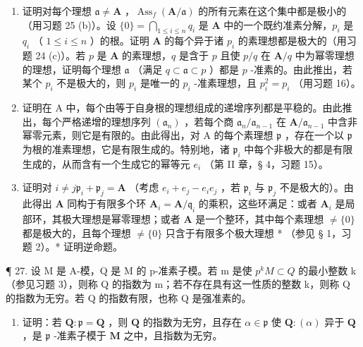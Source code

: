 \begin{enumerate}
\def\labelenumi{(\alph{enumi})}
\item
  证明对每个理想 \(\mathfrak{a} \neq \mathbf{A}\) ，\(\operatorname{Ass}_f(\mathbf{A} / \mathfrak{a})\) 的所有元素在这个集中都是极小的（用习题 25 (b)）。设 \(\{0\} = \bigcap_{1 \leqslant i \leqslant n} q_i\) 是 \(\mathbf{A}\) 中的一个既约准素分解，\(p_i\) 是 \(q_i\) （ \(1 \leqslant i \leqslant n\) ）的根。证明 \(\mathbf{A}\) 的每个异于诸 \(p_i\) 的素理想都是极大的（用习题 24 (c)）。若 \(p\) 是 \(\mathbf{A}\) 的素理想，\(q\) 是含于 \(p\) 且使 \(p / q\) 在 \(\mathbf{A} / q\) 中为幂零理想的理想，证明每个理想 \(\mathfrak{a}\) （满足 \(q \subset \mathfrak{a} \subset p\) ）都是 \(p\) -准素的。由此推出，若某个 \(p_i\) 不是极大的，则 \(p_i\) 是唯一的 \(p_i\) -准素理想，且 \(p_i^2 = p_i\) （用习题 16）。
\item
  证明在 A 中，每个由等于自身根的理想组成的递增序列都是平稳的。由此推出，每个严格递增的理想序列 \((\mathfrak{a}_n)\) ，若每个商 \(\mathfrak{a}_n / \mathfrak{a}_{n-1}\) 在 \(\mathbf{A} / \mathfrak{a}_{n-1}\) 中含非幂零元素，则它是有限的。由此得出，对 A 的每个素理想 \(\mathfrak{p}\) ，存在一个以 \(\mathfrak{p}\) 为根的准素理想，它是有限生成的。特别地，诸 \(\mathfrak{p}_i\) 中每个非极大的都是有限生成的，从而含有一个生成它的幂等元 \(e_i\) （第 II 章，§ 4，习题 15）。
\item
  证明对 \(i \neq j \mathfrak{p}_i + \mathfrak{p}_j = \mathbf{A}\) （考虑 \(e_i + e_j - e_i e_j\) ，若 \(\mathfrak{p}_i\) 与 \(\mathfrak{p}_j\) 不是极大的）。由此得出 \(\mathbf{A}\) 同构于有限多个环 \(\mathbf{A}_i = \mathbf{A} / \mathfrak{q}_i\) 的乘积，这些环满足：或者 \(\mathbf{A}_i\) 是局部环，其极大理想是幂零理想；或者 \(\mathbf{A}\) 是一个整环，其中每个素理想 \(\neq \{0\}\) 都是极大的，且每个理想 \(\neq\{0\}\) 只含于有限多个极大理想 * （参见 § 1，习题 2）。* 证明逆命题。
\end{enumerate}

¶ 27. 设 M 是 A-模，Q 是 M 的 p-准素子模。若 m 是使 \(p^{k}M \subset Q\) 的最小整数 k（参见习题 3），则称 Q 的指数为 m；若不存在具有这一性质的整数 k，则称 Q 的指数为无穷。若 Q 的指数有限，也称 Q 是强准素的。

\begin{enumerate}
\def\labelenumi{(\alph{enumi})}
\tightlist
\item
  证明：若 \(\mathbf{Q} \colon \mathfrak{p} = \mathbf{Q}\) ，则 \(\mathbf{Q}\) 的指数为无穷，且存在 \(\alpha \in \mathfrak{p}\) 使 \(\mathbf{Q} \colon (\alpha)\) 异于 \(\mathbf{Q}\) ，是 \(\mathfrak{p}\) -准素子模于 \(\mathbf{M}\) 之中，且指数为无穷。
\end{enumerate}

